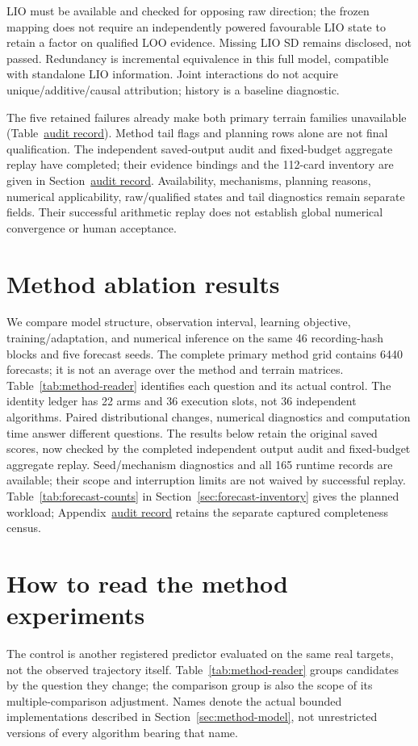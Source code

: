 LIO must be available and checked for opposing raw direction; the frozen
mapping does not require an independently powered favourable LIO state
to retain a factor on qualified LOO evidence. Missing LIO SD remains disclosed,
not passed. Redundancy is incremental equivalence in this full model,
compatible with standalone LIO information. Joint interactions do not acquire
unique/additive/causal attribution; history is a baseline diagnostic.

The five retained failures already make both primary terrain families
unavailable (Table~\href{audit-notes.pdf\#tab:failure-family-dispositions}{audit record}). Method tail flags
and planning rows alone are not final qualification. The independent saved-output
audit and fixed-budget aggregate replay have completed; their evidence bindings
and the 112-card inventory are given in Section~\href{audit-notes.pdf\#sec:audited-review-update}{audit record}.
Availability, mechanisms, planning reasons, numerical applicability, raw/qualified
states and tail diagnostics remain separate fields. Their successful arithmetic
replay does not establish global numerical convergence or human acceptance.


\section{Method ablation results}
\label{sec:method-results}\hypertarget{sec:method-results}{}
We compare model structure, observation interval, learning objective,
training/adaptation, and numerical inference on the same 46 recording-hash
blocks and five forecast seeds. The complete primary method grid contains
6440 forecasts; it is not an average over the method and terrain matrices.
Table~\ref{tab:method-reader} identifies each question and its actual control.
The identity ledger has 22 arms and 36 execution slots, not 36 independent algorithms.
Paired distributional changes, numerical diagnostics and computation time
answer different questions. The results below retain the original saved scores,
now checked by the completed independent output audit and fixed-budget aggregate
replay. Seed/mechanism diagnostics and all 165 runtime records are available;
their scope and interruption limits are not waived by successful replay.
Table~\ref{tab:forecast-counts} in Section~\ref{sec:forecast-inventory}
gives the planned workload; Appendix~\href{audit-notes.pdf\#sec:execution-coverage}{audit record} retains
the separate captured completeness census.


\section{How to read the method experiments}
\label{sec:method-reader}\hypertarget{sec:method-reader}{}
The control is another registered predictor evaluated on the same real
targets, not the observed trajectory itself. Table~\ref{tab:method-reader}
groups candidates by the question they change; the comparison group is also
the scope of its multiple-comparison adjustment. Names denote the actual
bounded implementations described in Section~\ref{sec:method-model}, not
unrestricted versions of every algorithm bearing that name.


